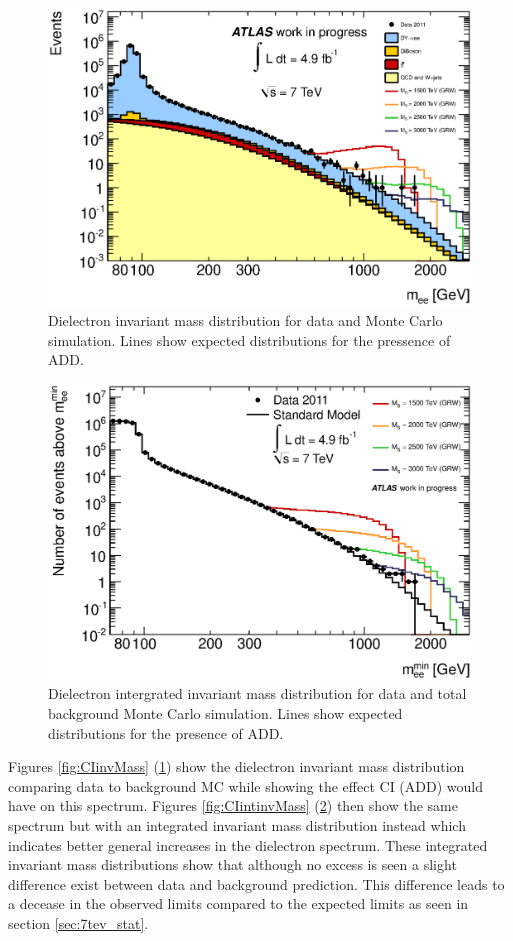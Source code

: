 	\begin{figure}[h!p]
	\centering
	\includegraphics[width=0.9\linewidth]{images/ADD_inv_mass.eps}
	\caption{Dielectron invariant mass distribution for data and Monte Carlo simulation. Lines show expected distributions for the pressence of ADD.}
	\label{fig:ADDinvMass}
	\end{figure}

	\begin{figure}[h!p]
	\centering
	\includegraphics[width=0.9\linewidth]{images/ADD_int_inv_mass.eps}
	\caption{Dielectron intergrated invariant mass distribution for data and total background Monte Carlo simulation. Lines show expected distributions for the presence of ADD.}
	\label{fig:ADDintinvMass}
	\end{figure}


	Figures \ref{fig:CIinvMass} (\ref{fig:ADDinvMass}) show the dielectron invariant mass distribution comparing data to background MC while showing the effect CI (ADD) would have on this spectrum. Figures \ref{fig:CIintinvMass} (\ref{fig:ADDintinvMass}) then show the same spectrum but with an integrated invariant mass distribution instead which indicates better general increases in the dielectron spectrum. These integrated invariant mass distributions show that although no excess is seen a slight difference exist between data and background prediction. This difference leads to a decease in the observed limits compared to the expected limits as seen in section \ref{sec:7tev_stat}.





